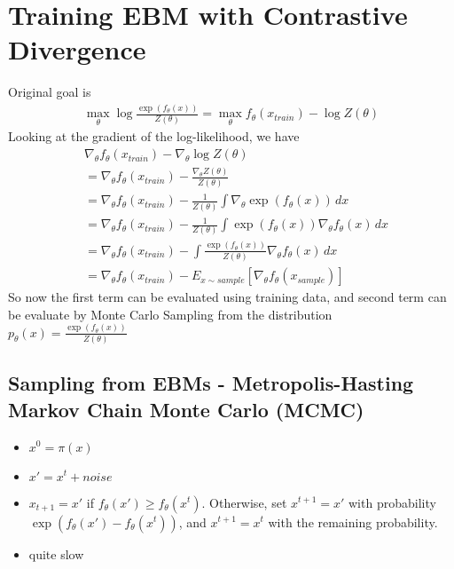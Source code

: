 \section{Training EBM with Contrastive Divergence} 
Original goal is 
    \begin{align*}
        \max_\theta \log \frac{\exp(f_\theta(x))}{Z(\theta)} = \max_\theta f_\theta(x_{train}) - \log Z(\theta)
    \end{align*}
Looking at the gradient of the log-likelihood, we have 
    \begin{align*}
        & \nabla_\theta f_\theta(x_{train}) - \nabla_\theta \log Z(\theta)\\
        & =  \nabla_\theta f_\theta(x_{train}) - \frac{\nabla_\theta Z(\theta)}{Z(\theta)}\\
        & = \nabla_\theta f_\theta(x_{train}) - \frac{1}{Z(\theta)}\int \nabla_\theta \exp(f_\theta(x)) \, dx\\
        & = \nabla_\theta f_\theta(x_{train}) - \frac{1}{Z(\theta)}\int \exp(f_\theta(x)) \nabla_\theta f_\theta(x) \, dx\\
        & =  \nabla_\theta f_\theta(x_{train}) - \int \frac{\exp(f_\theta(x)) }{Z(\theta)} \nabla_\theta f_\theta(x) \, dx\\
        & = \nabla_\theta f_\theta(x_{train}) - E_{x \sim sample}[\nabla_\theta f_\theta(x_{sample})]
    \end{align*}
So now the first term can be evaluated using training data, and second term can be evaluate by Monte Carlo Sampling from the distribution $p_\theta(x) = \frac{\exp(f_\theta(x))}{Z(\theta)}$


\subsection{Sampling from EBMs - Metropolis-Hasting Markov Chain Monte Carlo (MCMC)} 
    \begin{itemize}
        \item $x^0 = \pi(x)$
        \item $x' = x^t + noise$
        \item $x_{t+1} = x'$ if $f_\theta(x') \geq f_\theta(x^t)$. Otherwise, set $x^{t+1} = x'$ with probability $\exp(f_\theta(x') - f_\theta(x^t))$, and $x^{t+1}=x^t$ with the remaining probability. 
        \item quite slow
    \end{itemize}

